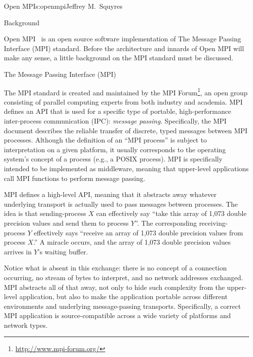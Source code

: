 \begin{aosachapter}{Open MPI}{s:openmpi}{Jeffrey M.\ Squyres}

\begin{aosasect1}{Background}

Open MPI~\cite{bib:open-mpi-general} is an open source software
implementation of The Message Passing Interface (MPI) standard.
Before the architecture and innards of Open MPI will make any sense,
a little background on the MPI standard must be discussed.


\begin{aosasect2}{The Message Passing Interface (MPI)}

The MPI standard is created and maintained by the MPI
Forum\footnote{\url{http://www.mpi-forum.org/}}, an open group
consisting of parallel computing experts from both industry and
academia.  MPI defines an API that is used for a specific type of
portable, high-performance inter-process communication (IPC):
\emph{message passing}.  Specifically, the MPI document describes the
reliable transfer of discrete, typed messages between MPI processes.
Although the definition of an ``MPI process'' is subject to
interpretation on a given platform, it usually corresponds to the
operating system's concept of a process (e.g., a POSIX process).  MPI
is specifically intended to be implemented as middleware, meaning that
upper-level applications call MPI functions to perform message
passing.

MPI defines a high-level API, meaning that it abstracts away whatever
underlying transport is actually used to pass messages between
processes.  The idea is that sending-process $X$ can effectively say
``take this array of 1,073 double precision values and send them to
process $Y$''.  The corresponding receiving-process $Y$ effectively
says ``receive an array of 1,073 double precision values from process
$X$.''  A miracle occurs, and the array of 1,073 double precision
values arrives in $Y$'s waiting buffer.

Notice what is absent in this exchange: there is no concept of a
connection occurring, no stream of bytes to interpret, and no network
addresses exchanged.  MPI abstracts all of that away, not only to hide
such complexity from the upper-level application, but also to make the
application portable across different environments and underlying
message-passing transports.  Specifically, a correct MPI application
is source-compatible across a wide variety of platforms and network
types.


\end{aosasect2}
\end{aosasect1}
\end{aosachapter}
